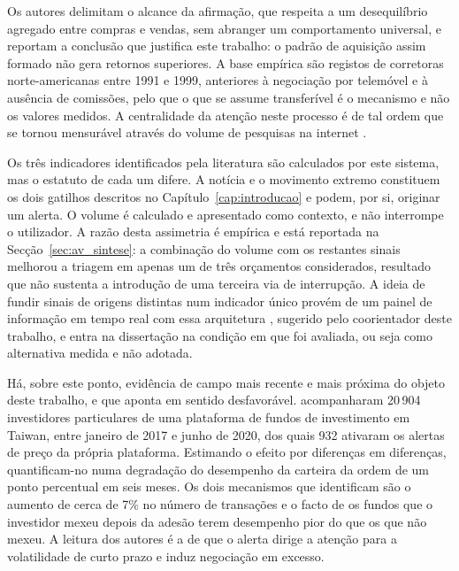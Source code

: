Os autores delimitam o
alcance da afirmação, que respeita a um desequilíbrio agregado entre compras e vendas, sem
abranger um comportamento universal, e reportam a conclusão que justifica este trabalho: o padrão de aquisição
assim formado não gera retornos superiores. A base empírica são registos de corretoras
norte-americanas entre 1991 e 1999, anteriores à negociação por telemóvel e à ausência de
comissões, pelo que o que se assume transferível é o mecanismo e não os valores medidos. A
centralidade da atenção neste processo é de tal ordem que se tornou mensurável através do volume de
pesquisas na internet \autocite{da2011attention}.

Os três indicadores identificados pela literatura são calculados por este sistema, mas o estatuto
de cada um difere. A notícia e o movimento extremo constituem os dois gatilhos descritos no
Capítulo~\ref{cap:introducao} e podem, por si, originar um alerta. O volume é calculado e
apresentado como contexto, e não interrompe o utilizador. A razão desta assimetria é empírica e
está reportada na Secção~\ref{sec:av_sintese}: a combinação do volume com os restantes sinais
melhorou a triagem em apenas um de três orçamentos considerados, resultado que não sustenta a
introdução de uma terceira via de interrupção. A ideia de fundir sinais de origens distintas num
indicador único provém de um painel de informação em tempo real com essa arquitetura
\autocite{worldmonitor2026}, sugerido pelo coorientador deste trabalho, e entra na dissertação na
condição em que foi avaliada, ou seja como alternativa medida e não adotada.

Há, sobre este ponto, evidência de campo mais recente e mais próxima do objeto deste trabalho, e
que aponta em sentido desfavorável. \textcite{liu2023alerts} acompanharam 20\,904 investidores
particulares de uma plataforma de fundos de investimento em Taiwan, entre janeiro de 2017 e junho
de 2020, dos quais 932 ativaram os alertas de preço da própria plataforma. Estimando o efeito por
diferenças em diferenças, quantificam-no numa degradação do desempenho da carteira da ordem de um
ponto percentual em seis meses. Os dois mecanismos que identificam são o aumento de cerca de 7\% no
número de transações e o facto de os fundos que o investidor mexeu depois da adesão terem
desempenho pior do que os que não mexeu. A leitura dos autores é a de que o alerta dirige a atenção
para a volatilidade de curto prazo e induz negociação em excesso.

